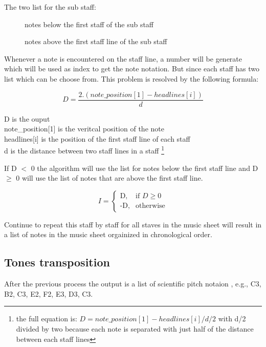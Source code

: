 \documentclass[a4paper,12pt]{report}
\begin{document}
\vspace{\baselineskip}
The two list for the sub staff:
\begin{figure}[h]
\centering
\makebox[\textwidth]{['G3','F3','E3','D3','C3','B2','A2','G2','F2','E2','D2','C2','B1','A1','G1','F1','E1']}
\caption{notes below the first staff of the sub staff}
\vspace{\baselineskip}
\makebox[\textwidth]{['G3','A3','B3','C4','D4','E4','F4','G4','A4','B4']}
\caption{notes above the first staff line of the sub staff}
\end{figure}

Whenever a note is encountered on the staff line, a number will be generate
which will be used as index to get the note notation. But since each staff 
has two list which can be choose from. This problem is resolved by the 
following formula:

\[D = \frac{2.(note\_position[1] - headlines[i])}{d}\]


\noindent D is the ouput\\
note\_position[1] is the veritcal position of the note\\
headlines[i] is the position of the first staff line of each staff\\
d is the distance between two staff lines in a staff \footnote{the 
full equation is: \(D = note\_position[1] -headlines[i] / d/2\)
with d/2 divided by two because each note is separated with just half of the distance between
each staff lines}

If D $<$ 0 the algorithm will use the list for notes below the first staff line
and D $\geq$ 0 will use the list of notes that are above the first staff line.

\[ I = \begin{cases} \mbox{D,} & \mbox{if } D \geq 0 \\ \mbox{-D,} &
\mbox{otherwise} \end{cases}\]


Continue to repeat this staff by staff for all staves in the music sheet will result in 
a list of notes in the music sheet orgainized in chronological order.

\subsection{Tones transposition}
After the previous process the output is a list of scientific pitch notaion
\cite{Wikipedia2013}, e.g., C3, B2, C3, E2, F2, E3, D3, C3.\\
\end{document}
